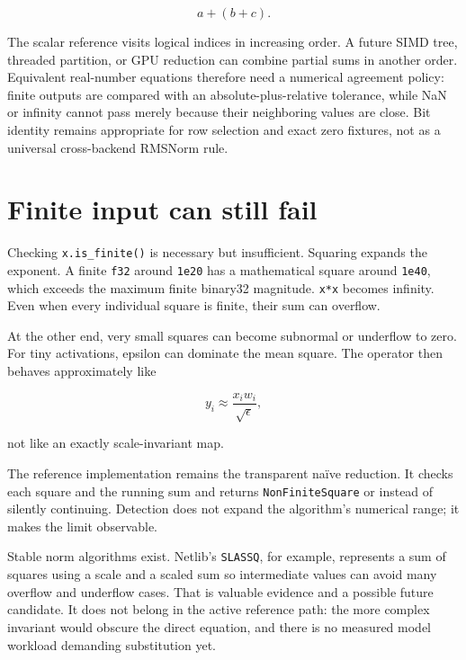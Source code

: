 \begin{equation}
a+(b+c).
\end{equation}

The scalar reference visits logical indices in increasing order. A
future SIMD tree, threaded partition, or GPU reduction can combine
partial sums in another order. Equivalent real-number equations
therefore need a numerical agreement policy: finite outputs are compared
with an absolute-plus-relative tolerance, while NaN or infinity cannot
pass merely because their neighboring values are close. Bit identity
remains appropriate for row selection and exact zero fixtures, not as a
universal cross-backend RMSNorm rule.

\section{Finite input can still
fail}\label{finite-input-can-still-fail}


Checking \texttt{x.is\_finite()} is necessary but insufficient. Squaring
expands the exponent. A finite \texttt{f32} around \texttt{1e20} has a
mathematical square around \texttt{1e40}, which exceeds the maximum
finite binary32 magnitude. \texttt{x*x} becomes infinity. Even when
every individual square is finite, their sum can overflow.

At the other end, very small squares can become subnormal or underflow
to zero. For tiny activations, epsilon can dominate the mean square. The
operator then behaves approximately like

\begin{equation}
y_i\approx\frac{x_iw_i}{\sqrt{\epsilon}},
\end{equation}

not like an exactly scale-invariant map.

The reference implementation remains the transparent naïve reduction. It
checks each square and the running sum and returns
\texttt{NonFiniteSquare} or \texttt{}
instead of silently continuing. Detection does not expand the
algorithm's numerical range; it makes the limit observable.

Stable norm algorithms exist. Netlib's \texttt{SLASSQ}, for example,
represents a sum of squares using a scale and a scaled sum so
intermediate values can avoid many overflow and underflow cases. That is
valuable evidence and a possible future candidate. It does not belong in
the active  reference path: the more complex invariant would
obscure the direct equation, and there is no measured model workload
demanding substitution yet.

